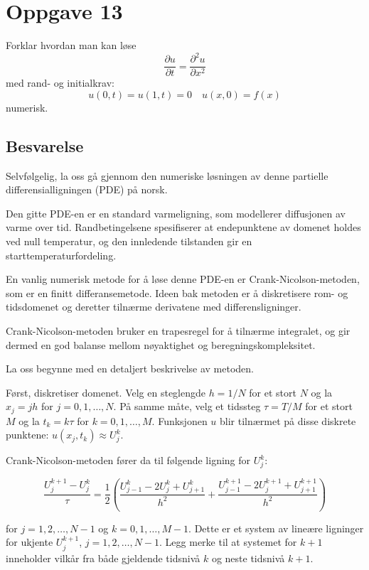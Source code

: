 \section{Oppgave 13}
Forklar hvordan man kan løse
\begin{equation*}
    \frac{\partial u}{\partial t}=\frac{\partial^{2} u}{\partial x^{2}}
\end{equation*}
med rand- og initialkrav:
\begin{equation*}
    u(0, t)=u(1, t)=0 \quad u(x, 0)=f(x)
\end{equation*}
numerisk.
\subsection*{Besvarelse}
Selvfølgelig, la oss gå gjennom den numeriske løsningen av denne partielle differensialligningen (PDE) på norsk.

Den gitte PDE-en er en standard varmeligning, som modellerer diffusjonen av varme over tid. Randbetingelsene spesifiserer at endepunktene av domenet holdes ved null temperatur, og den innledende tilstanden gir en starttemperaturfordeling.

En vanlig numerisk metode for å løse denne PDE-en er Crank-Nicolson-metoden, som er en finitt differansemetode. Ideen bak metoden er å diskretisere rom- og tidsdomenet og deretter tilnærme derivatene med differensligninger.

Crank-Nicolson-metoden bruker en trapesregel for å tilnærme integralet, og gir dermed en god balanse mellom nøyaktighet og beregningskompleksitet.

La oss begynne med en detaljert beskrivelse av metoden.

Først, diskretiser domenet. Velg en steglengde $h=1/N$ for et stort $N$ og la $x_j=jh$ for $j=0,1,\ldots,N$. På samme måte, velg et tidssteg $\tau=T/M$ for et stort $M$ og la $t_k=k\tau$ for $k=0,1,\ldots,M$. Funksjonen $u$ blir tilnærmet på disse diskrete punktene: $u(x_j,t_k) \approx U_j^k$.

Crank-Nicolson-metoden fører da til følgende ligning for $U_j^k$:

\begin{equation*}
\frac{U_j^{k+1} - U_j^k}{\tau} = \frac{1}{2} \left( \frac{U_{j-1}^k - 2U_j^k + U_{j+1}^k}{h^2} + \frac{U_{j-1}^{k+1} - 2U_j^{k+1} + U_{j+1}^{k+1}}{h^2} \right)
\end{equation*}

for $j = 1,2,\ldots,N-1$ og $k=0,1,\ldots,M-1$. Dette er et system av lineære ligninger for ukjente $U_j^{k+1}$, $j=1,2,\ldots,N-1$. Legg merke til at systemet for $k+1$ inneholder vilkår fra både gjeldende tidsnivå $k$ og neste tidsnivå $k+1$.


